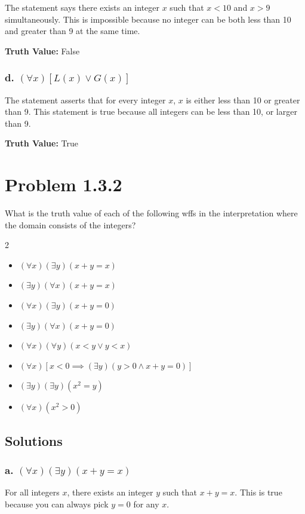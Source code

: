 \documentclass[12pt]{article}
\begin{document}
The statement says there exists an integer \( x \) such that \( x < 10 \) and \( x > 9 \) simultaneously. This is impossible because no integer can be both less than 10 and greater than 9 at the same time.

\textbf{Truth Value:} False

\subsubsection*{d. \((\forall x)[L(x) \lor G(x)]\)}

The statement asserts that for every integer \( x \), \( x \) is either less than 10 or greater than 9. This statement is true because all integers can be less than 10, or larger than 9.

\textbf{Truth Value:} True


\newpage
\section*{Problem 1.3.2}
What is the truth value of each of the following wffs in the interpretation where the domain consists of the integers?

\begin{multicols}{2}
\begin{itemize}
    \item[a.] \((\forall x)(\exists y)(x + y = x)\)
    \item[b.] \((\exists y)(\forall x)(x + y = x)\)
    \item[c.] \((\forall x)(\exists y)(x + y = 0)\)
    \item[d.] \((\exists y)(\forall x)(x + y = 0)\)
    \item[e.] \((\forall x)(\forall y)(x < y \lor y < x)\)
    \item[f.] \((\forall x)[x < 0 \implies (\exists y)(y > 0 \land x + y = 0)]\)
    \item[g.] \((\exists y)(\exists y)(x^2 = y)\)
    \item[h.] \((\forall x)(x^2 > 0)\)
\end{itemize}
\end{multicols}
\subsection*{Solutions}

\subsubsection*{a. \((\forall x)(\exists y)(x + y = x)\)}
For all integers \( x \), there exists an integer \( y \) such that \( x + y = x \). This is true because you can always pick \( y = 0 \) for any \( x \).
\end{document}

